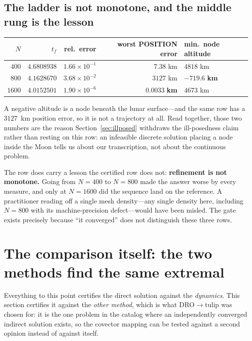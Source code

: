 \documentclass[11pt]{article}
\begin{document}
\subsection{The ladder is not monotone, and the middle rung is the lesson}

\begin{table}[h]
\centering\small
\begin{tabular}{rrrrl}
\toprule
$N$ & $t_f$ & rel.\ error & worst POSITION error & min.\ node altitude \\
\midrule
$400$  & $4.6808938$ & $1.66\times10^{-1}$ & $7.38$ km & $4818$ km \\
$800$  & $4.1628670$ & $3.68\times10^{-2}$ & $3127$ km & $\mathbf{-719.6}$ \textbf{km} \\
$1600$ & $4.0152501$ & $1.90\times10^{-6}$ & $\mathbf{0.0033}$ \textbf{km} & $4673$ km \\
\bottomrule
\end{tabular}
\end{table}

A negative altitude is a node beneath the lunar surface---and the same row has a
$3127$~km position error, so it is not a trajectory at all. Read together, those
two numbers are the reason Section~\ref{sec:illposed} withdraws the
ill-posedness claim rather than resting on this row: an infeasible discrete
solution placing a node inside the Moon tells us about our transcription, not
about the continuous problem.

The row does carry a lesson the certified row does not: \textbf{refinement is not
monotone.} Going from $N = 400$ to $N = 800$ made the answer worse by every
measure, and only at $N = 1600$ did the sequence land on the reference. A
practitioner reading off a single mesh density---any single density here,
including $N = 800$ with its machine-precision defect---would have been misled.
The gate exists precisely because ``it converged'' does not distinguish these
three rows.

\section{The comparison itself: the two methods find the same extremal}
\label{sec:costatecmp}

Everything to this point certifies the direct solution against the
\emph{dynamics}. This section certifies it against the \emph{other method},
which is what DRO$\to$tulip was chosen for: it is the one problem in the catalog
where an independently converged indirect solution exists, so the covector
mapping can be tested against a second opinion instead of against itself.
\end{document}
